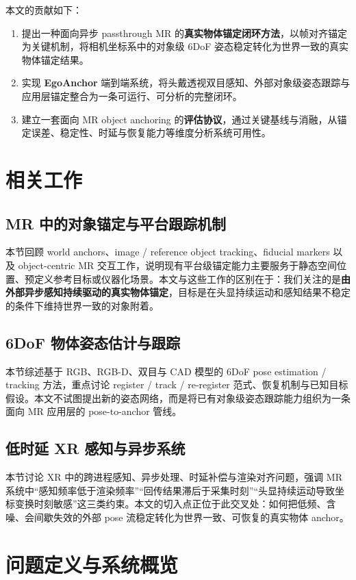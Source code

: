 \documentclass[review]{vgtc}
\begin{document}
本文的贡献如下：
\begin{enumerate}
  \item 提出一种面向异步 passthrough MR 的\textbf{真实物体锚定闭环方法}，以帧对齐锚定为关键机制，将相机坐标系中的对象级 6DoF 姿态稳定转化为世界一致的真实物体锚定结果。
  \item 实现 \textbf{EgoAnchor} 端到端系统，将头戴透视双目感知、外部对象级姿态跟踪与应用层锚定整合为一条可运行、可分析的完整闭环。
  \item 建立一套面向 MR object anchoring 的\textbf{评估协议}，通过关键基线与消融，从锚定误差、稳定性、时延与恢复能力等维度分析系统可用性。
\end{enumerate}

\section{相关工作}

\subsection{MR 中的对象锚定与平台跟踪机制}
本节回顾 world anchors、image / reference object tracking、fiducial markers 以及 object-centric MR 交互工作，说明现有平台级锚定能力主要服务于静态空间位置、预定义参考目标或仪器化场景。本文与这些工作的区别在于：我们关注的是\textbf{由外部异步感知持续驱动的真实物体锚定}，目标是在头显持续运动和感知结果不稳定的条件下维持世界一致的对象附着。

\subsection{6DoF 物体姿态估计与跟踪}
本节综述基于 RGB、RGB-D、双目与 CAD 模型的 6DoF pose estimation / tracking 方法，重点讨论 register / track / re-register 范式、恢复机制与已知目标假设。本文不试图提出新的姿态网络，而是将已有对象级姿态跟踪能力组织为一条面向 MR 应用层的 pose-to-anchor 管线。

\subsection{低时延 XR 感知与异步系统}
本节讨论 XR 中的跨进程感知、异步处理、时延补偿与渲染对齐问题，强调 MR 系统中“感知频率低于渲染频率”“回传结果滞后于采集时刻”“头显持续运动导致坐标变换时刻敏感”这三类约束。本文的切入点正位于此交叉处：如何把低频、含噪、会间歇失效的外部 pose 流稳定转化为世界一致、可恢复的真实物体 anchor。

\section{问题定义与系统概览}
\end{document}
